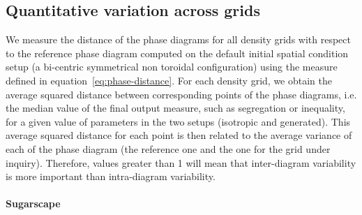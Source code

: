 \documentclass[preprint,5p,times,twocolumn,authoryear]{elsarticle}
\begin{document}
\subsection{Quantitative variation across grids}

We measure the distance of the phase diagrams for all density grids with respect to the reference phase diagram computed on the default initial spatial condition setup (a bi-centric symmetrical non toroidal configuration) using the measure defined in equation~\ref{eq:phase-distance}. For each density grid, we obtain the average squared distance between corresponding points of the phase diagrams, i.e. the median value of the final output measure, such as segregation or inequality, for a given value of parameters in the two setups (isotropic and generated). This average squared distance for each point is then related to the average variance of each of the phase diagram (the reference one and the one for the grid under inquiry). Therefore, values greater than 1 will mean that inter-diagram variability is more important than intra-diagram variability.

\paragraph{Sugarscape} 


\end{document}
